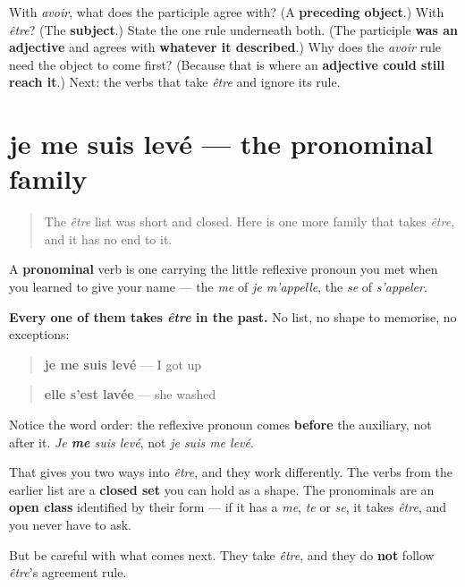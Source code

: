 \begin{tcolorbox}[breakable,colback=teal!4,colframe=teal!35!black,title={Before you move on}]
With \emph{avoir}, what does the participle agree with? (A \textbf{preceding object}.) With \emph{être}? (The \textbf{subject}.) State the one rule underneath both. (The participle \textbf{was an adjective} and agrees with \textbf{whatever it described}.) Why does the \emph{avoir} rule need the object to come first? (Because that is where an \textbf{adjective could still reach it}.) Next: the verbs that take \emph{être} and ignore its rule.
\end{tcolorbox}
\section[je me suis levé]{je me suis levé — the pronominal family}

\label{lesson:FR-C16-pronominal-etre}



\begin{quote}
The \emph{être} list was short and closed. Here is one more family that takes \emph{être}, and it has no end to it.
\end{quote}

\begin{grammarlens}[title={Grammar Lens: all of them, without exception}]
A \textbf{pronominal} verb is one carrying the little reflexive pronoun you met when you learned to give your name — the \emph{me} of \emph{je m'appelle}, the \emph{se} of \emph{s'appeler}.

\textbf{Every one of them takes \emph{être} in the past.} No list, no shape to memorise, no exceptions:

\begin{quote}
\textbf{je me suis levé} — I got up
\end{quote}

\begin{quote}
\textbf{elle s'est lavée} — she washed
\end{quote}

Notice the word order: the reflexive pronoun comes \textbf{before} the auxiliary, not after it. \emph{Je \textbf{me} suis levé}, not \emph{je suis me levé}.

That gives you two ways into \emph{être}, and they work differently. The verbs from the earlier list are a \textbf{closed set} you can hold as a shape. The pronominals are an \textbf{open class} identified by their form — if it has a \emph{me}, \emph{te} or \emph{se}, it takes \emph{être}, and you never have to ask.

But be careful with what comes next. They take \emph{être}, and they do \textbf{not} follow \emph{être}'s agreement rule.
\end{grammarlens}

